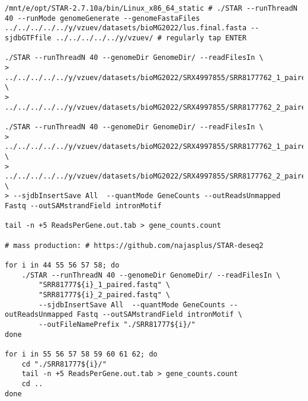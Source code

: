 \begin{verbatim}
/mnt/e/opt/STAR-2.7.10a/bin/Linux_x86_64_static # ./STAR --runThreadN 40 --runMode genomeGenerate --genomeFastaFiles ../../../../../y/vzuev/datasets/bioMG2022/lus.final.fasta --sjdbGTFfile ../../../../../y/vzuev/ # regularly tap ENTER

./STAR --runThreadN 40 --genomeDir GenomeDir/ --readFilesIn \
> ../../../../../y/vzuev/datasets/bioMG2022/SRX4997855/SRR8177762_1_paired.fastq \
> ../../../../../y/vzuev/datasets/bioMG2022/SRX4997855/SRR8177762_2_paired.fastq

./STAR --runThreadN 40 --genomeDir GenomeDir/ --readFilesIn \
> ../../../../../y/vzuev/datasets/bioMG2022/SRX4997855/SRR8177762_1_paired.fastq \
> ../../../../../y/vzuev/datasets/bioMG2022/SRX4997855/SRR8177762_2_paired.fastq \
> --sjdbInsertSave All  --quantMode GeneCounts --outReadsUnmapped Fastq --outSAMstrandField intronMotif

tail -n +5 ReadsPerGene.out.tab > gene_counts.count

# mass production: # https://github.com/najasplus/STAR-deseq2

for i in 44 55 56 57 58; do
    ./STAR --runThreadN 40 --genomeDir GenomeDir/ --readFilesIn \
        "SRR81777${i}_1_paired.fastq" \
        "SRR81777${i}_2_paired.fastq" \
        --sjdbInsertSave All  --quantMode GeneCounts --outReadsUnmapped Fastq --outSAMstrandField intronMotif \
        --outFileNamePrefix "./SRR81777${i}/"
done

for i in 55 56 57 58 59 60 61 62; do
    cd "./SRR81777${i}/"
    tail -n +5 ReadsPerGene.out.tab > gene_counts.count
    cd ..
done

\end{verbatim}
